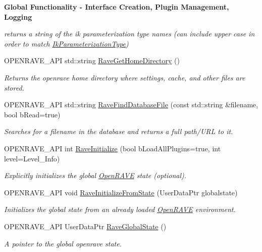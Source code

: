 \begin{Indent}{\bf Global Functionality -\/ Interface Creation, Plugin Management, Logging}
\begin{DoxyCompactItemize}
\begin{DoxyCompactList}\small\item\em returns a string of the ik parameterization type names (can include upper case in order to match \hyperlink{namespaceOpenRAVE_a16f7833e516a35d385ac594a44e44a2e}{IkParameterizationType}) \item\end{DoxyCompactList}\item 
OPENRAVE\_\-API std::string \hyperlink{namespaceOpenRAVE_a55e1d8c68b801cd293ec78b8d417b7e6}{RaveGetHomeDirectory} ()
\begin{DoxyCompactList}\small\item\em Returns the openrave home directory where settings, cache, and other files are stored. \item\end{DoxyCompactList}\item 
OPENRAVE\_\-API std::string \hyperlink{namespaceOpenRAVE_a3faf74c6f78a579f18995764df3142e5}{RaveFindDatabaseFile} (const std::string \&filename, bool bRead=true)
\begin{DoxyCompactList}\small\item\em Searches for a filename in the database and returns a full path/URL to it. \item\end{DoxyCompactList}\item 
OPENRAVE\_\-API int \hyperlink{namespaceOpenRAVE_a85619ef1740cd97d7dcb5ef306243a75}{RaveInitialize} (bool bLoadAllPlugins=true, int level=Level\_\-Info)
\begin{DoxyCompactList}\small\item\em Explicitly initializes the global \hyperlink{namespaceOpenRAVE}{OpenRAVE} state (optional). \item\end{DoxyCompactList}\item 
OPENRAVE\_\-API void \hyperlink{namespaceOpenRAVE_a4acb966ec91e783a5d3a5967583bb2c0}{RaveInitializeFromState} (UserDataPtr globalstate)
\begin{DoxyCompactList}\small\item\em Initializes the global state from an already loaded \hyperlink{namespaceOpenRAVE}{OpenRAVE} environment. \item\end{DoxyCompactList}\item 
OPENRAVE\_\-API UserDataPtr \hyperlink{namespaceOpenRAVE_ac3c20e38f24dedcd46add394fd8074fb}{RaveGlobalState} ()
\begin{DoxyCompactList}\small\item\em A pointer to the global openrave state. \item\end{DoxyCompactList}\item 

\end{DoxyCompactItemize}
\end{Indent}
